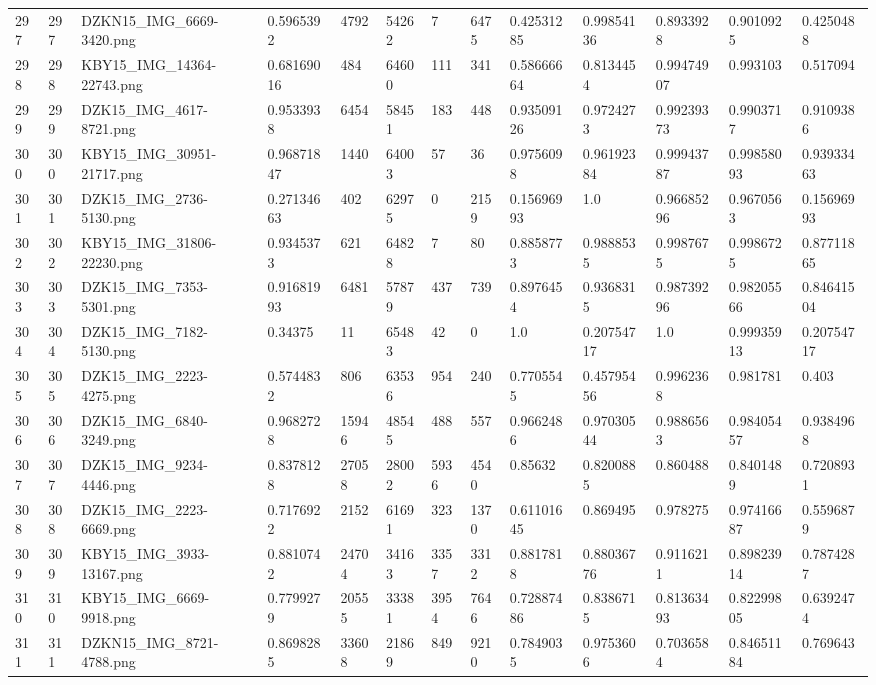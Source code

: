 \documentclass[11pt, a4paper, twoside]{report}
\begin{document}
\begin{longtable}[c]{@{}lllllllllllll@{}}
297 & 297 & DZKN15\_IMG\_6669-3420.png & 0.5965392 & 4792 & 54262 & 7 & 6475 & 0.42531285 & 0.99854136 & 0.8933928 & 0.9010925 & 0.4250488 \\
298 & 298 & KBY15\_IMG\_14364-22743.png & 0.68169016 & 484 & 64600 & 111 & 341 & 0.58666664 & 0.8134454 & 0.99474907 & 0.993103 & 0.517094 \\
299 & 299 & DZK15\_IMG\_4617-8721.png & 0.9533938 & 6454 & 58451 & 183 & 448 & 0.93509126 & 0.9724273 & 0.99239373 & 0.9903717 & 0.9109386 \\
300 & 300 & KBY15\_IMG\_30951-21717.png & 0.96871847 & 1440 & 64003 & 57 & 36 & 0.9756098 & 0.96192384 & 0.99943787 & 0.99858093 & 0.93933463 \\
301 & 301 & DZK15\_IMG\_2736-5130.png & 0.27134663 & 402 & 62975 & 0 & 2159 & 0.15696993 & 1.0 & 0.96685296 & 0.9670563 & 0.15696993 \\
302 & 302 & KBY15\_IMG\_31806-22230.png & 0.9345373 & 621 & 64828 & 7 & 80 & 0.8858773 & 0.9888535 & 0.9987675 & 0.9986725 & 0.87711865 \\
303 & 303 & DZK15\_IMG\_7353-5301.png & 0.91681993 & 6481 & 57879 & 437 & 739 & 0.8976454 & 0.9368315 & 0.98739296 & 0.98205566 & 0.84641504 \\
304 & 304 & DZK15\_IMG\_7182-5130.png & 0.34375 & 11 & 65483 & 42 & 0 & 1.0 & 0.20754717 & 1.0 & 0.99935913 & 0.20754717 \\
305 & 305 & DZK15\_IMG\_2223-4275.png & 0.5744832 & 806 & 63536 & 954 & 240 & 0.7705545 & 0.45795456 & 0.9962368 & 0.981781 & 0.403 \\
306 & 306 & DZK15\_IMG\_6840-3249.png & 0.9682728 & 15946 & 48545 & 488 & 557 & 0.9662486 & 0.97030544 & 0.9886563 & 0.98405457 & 0.9384968 \\
307 & 307 & DZK15\_IMG\_9234-4446.png & 0.8378128 & 27058 & 28002 & 5936 & 4540 & 0.85632 & 0.8200885 & 0.860488 & 0.8401489 & 0.7208931 \\
308 & 308 & DZK15\_IMG\_2223-6669.png & 0.7176922 & 2152 & 61691 & 323 & 1370 & 0.61101645 & 0.869495 & 0.978275 & 0.97416687 & 0.5596879 \\
309 & 309 & KBY15\_IMG\_3933-13167.png & 0.8810742 & 24704 & 34163 & 3357 & 3312 & 0.8817818 & 0.88036776 & 0.9116211 & 0.89823914 & 0.7874287 \\
310 & 310 & KBY15\_IMG\_6669-9918.png & 0.7799279 & 20555 & 33381 & 3954 & 7646 & 0.72887486 & 0.8386715 & 0.81363493 & 0.82299805 & 0.6392474 \\
311 & 311 & DZKN15\_IMG\_8721-4788.png & 0.8698285 & 33608 & 21869 & 849 & 9210 & 0.7849035 & 0.9753606 & 0.7036584 & 0.84651184 & 0.769643 \\

\end{longtable}
\end{document}
